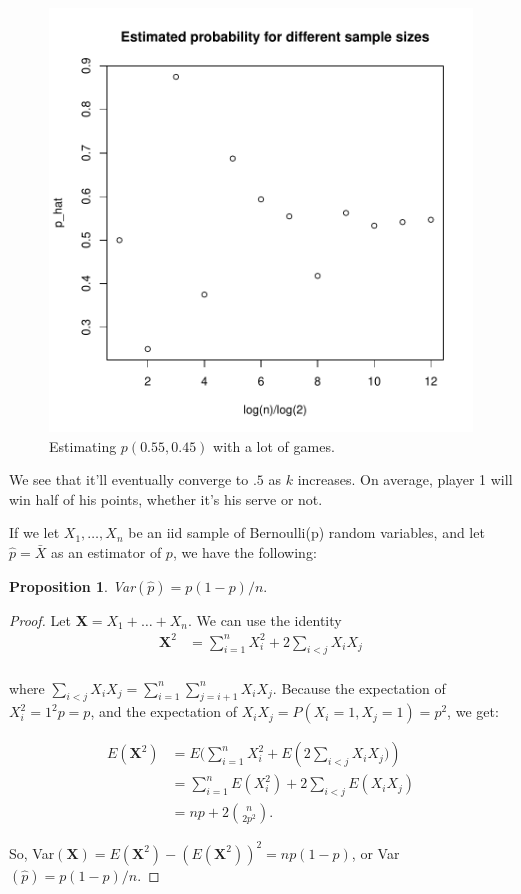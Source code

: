 \documentclass[10pt, oneside, reqno]{article}
\newtheorem{proposition}[theorem]{Proposition}
\theoremstyle{plain}
\begin{document}
\begin{figure}
\begin{center}
\includegraphics{spa1_tn248-squashgamesimulations}
\end{center}
\caption{Estimating $p(0.55,0.45)$ with a lot of games.}
\label{fig:squashgamesimulations}
\end{figure}

We see that it'll eventually converge to $.5$ as $k$ increases. On average, player 1 will win half of his points, whether it's his serve or not.

If we let $X_1,\ldots,X_n$ be an iid sample of Bernoulli(p) random variables, and let $\hat{p}=\bar{X}$ as an estimator of $p$, we have the following:

\begin{proposition}
	Var$(\hat{p})=p(1-p)/n.$
\end{proposition}

\begin{proof}
	Let \textbf{X}$=X_1 + \ldots + X_n$. We can use the identity
	\begin{align}
		\textbf{X}^2 &= \sum_{i=1}^n X_i^2 + 2 \sum_{i<j}X_iX_j\\
	\end{align}
	
	where $\sum_{i<j} X_iX_j = \sum_{i=1}^n \sum_{j=i+1}^n X_iX_j$. Because the expectation of $X_i^2 = 1^2p=p$, and the expectation of $X_iX_j=P(X_i=1,X_j=1)=p^2$, we get:
	
	\begin{align}
		E(\textbf{X}^2)&=E(\sum_{i=1}^n X_i^2 + E\left(2\sum_{i<j}X_iX_j)\right)\\
		&=\sum_{i=1}^n E(X_i^2)+2\sum_{i<j}E(X_iX_j)\\
		&=np+2 {n\choose 2 p^2}.
	\end{align}
	
	So, Var$(\textbf{X})=E(\textbf{X}^2)-(E(\textbf{X}^2))^2 = np(1-p)$, or Var $(\hat{p})=p(1-p)/n$.
\end{proof}
\end{document}
